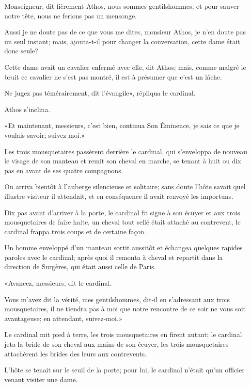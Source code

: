 \speak  Monseigneur, dit fièrement Athos, nous sommes gentilshommes, et pour sauver notre tête, nous ne ferions pas un mensonge. 

\speak  Aussi je ne doute pas de ce que vous me dites, monsieur Athos, je n'en doute pas un seul instant; mais, ajouta-t-il pour changer la conversation, cette dame était donc seule? 

\speak  Cette dame avait un cavalier enfermé avec elle, dit Athos; mais, comme malgré le bruit ce cavalier ne s'est pas montré, il est à présumer que c'est un lâche. 

\speak  Ne jugez pas témérairement, dit l'évangile», répliqua le cardinal. 

Athos s'inclina. 

«Et maintenant, messieurs, c'est bien, continua Son Éminence, je sais ce que je voulais savoir; suivez-moi.» 

Les trois mousquetaires passèrent derrière le cardinal, qui s'enveloppa de nouveau le visage de son manteau et remit son cheval en marche, se tenant à huit ou dix pas en avant de ses quatre compagnons. 

On arriva bientôt à l'auberge silencieuse et solitaire; sans doute l'hôte savait quel illustre visiteur il attendait, et en conséquence il avait renvoyé les importuns. 

Dix pas avant d'arriver à la porte, le cardinal fit signe à son écuyer et aux trois mousquetaires de faire halte, un cheval tout sellé était attaché au contrevent, le cardinal frappa trois coups et de certaine façon. 

Un homme enveloppé d'un manteau sortit aussitôt et échangea quelques rapides paroles avec le cardinal; après quoi il remonta à cheval et repartit dans la direction de Surgères, qui était aussi celle de Paris. 

«Avancez, messieurs, dit le cardinal. 

\speak  Vous m'avez dit la vérité, mes gentilshommes, dit-il en s'adressant aux trois mousquetaires, il ne tiendra pas à moi que notre rencontre de ce soir ne vous soit avantageuse; en attendant, suivez-moi.» 

Le cardinal mit pied à terre, les trois mousquetaires en firent autant; le cardinal jeta la bride de son cheval aux mains de son écuyer, les trois mousquetaires attachèrent les brides des leurs aux contrevents. 

L'hôte se tenait sur le seuil de la porte; pour lui, le cardinal n'était qu'un officier venant visiter une dame. 

